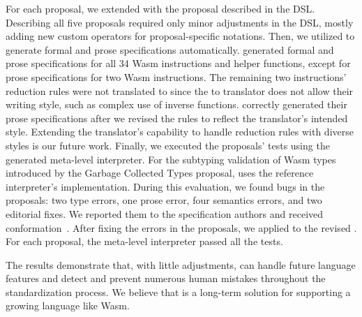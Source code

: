 For each proposal, we extended \specdsl with the proposal described in the DSL.
Describing all five proposals required only minor adjustments in the DSL,
mostly adding new custom operators for proposal-specific notations.
Then, we utilized \dslname to generate formal and prose specifications automatically.
\dslname generated formal and prose specifications for all 34 Wasm instructions and helper functions,
except for prose specifications for two Wasm instructions.
The remaining two instructions' reduction rules were not translated to \al
since the \dl to \al translator does not allow their writing style, such as complex use of inverse functions.
\dslname correctly generated their prose specifications
after we revised the rules to reflect the translator's intended style.
Extending the translator's capability to handle reduction rules with diverse styles is our future work.
Finally, we executed the proposals' tests using the generated meta-level interpreter.
For the subtyping validation of Wasm types introduced by the Garbage Collected Types proposal,
\dslname uses the reference interpreter's implementation.
During this evaluation, we found  bugs in the proposals:
two type errors, one prose error, four semantics errors, and two editorial fixes.
We reported them to the specification authors and received conformation~\cite{proposalbugs}.
After fixing the errors in the proposals, we applied \dslname to the revised \specdsl.
For each proposal, the meta-level interpreter passed all the tests.

The results demonstrate that, with little adjustments,
\dslname can handle future language features and detect and prevent
numerous human mistakes throughout the standardization process.
We believe that \dslname is a long-term solution for supporting a growing
language like Wasm.
